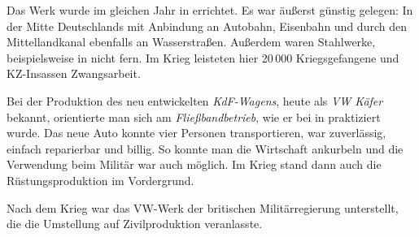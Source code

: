 Das Werk wurde im gleichen Jahr in 
errichtet. Es war äußerst günstig gelegen: In der Mitte
Deutschlands mit Anbindung an Autobahn, Eisenbahn und durch den
Mittellandkanal ebenfalls an Wasserstraßen. Außerdem waren Stahlwerke,
beispielsweise in  nicht fern. Im Krieg leisteten hier
20\,000 Kriegsgefangene und KZ-Insassen Zwangsarbeit.

Bei der Produktion des neu entwickelten
\emph{KdF-Wagens}, heute als \emph{VW Käfer} bekannt, orientierte man sich am
\emph{Fließbandbetrieb}, wie er bei
 in  praktiziert wurde. Das neue Auto konnte
vier Personen transportieren, war zuverlässig, einfach reparierbar und
billig. So konnte man die Wirtschaft ankurbeln und die Verwendung beim
Militär war auch möglich.  Im Krieg stand dann auch die
Rüstungsproduktion im Vordergrund.  

Nach dem Krieg war das VW-Werk der britischen Militärregierung
 unterstellt, die die Umstellung auf
Zivilproduktion veranlasste.

\endinput
